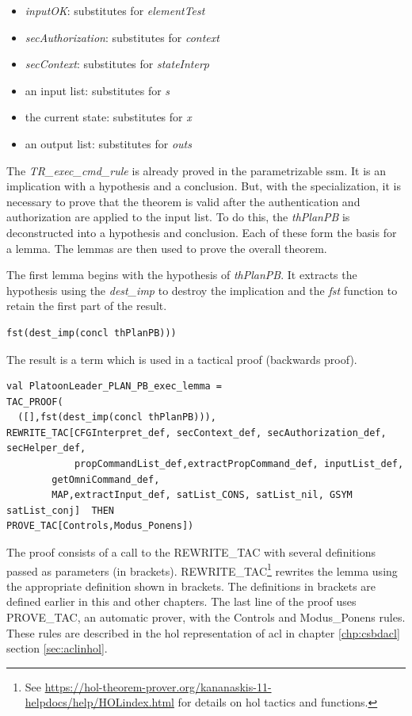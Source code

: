 \documentclass[../../main/main.tex]{subfiles}
\begin{document}
\begin{itemize}
\item \textit{inputOK}: substitutes for \textit{elementTest}
\item \textit{secAuthorization}: substitutes for \textit{context}
\item \textit{secContext}: substitutes for \textit{stateInterp}
\item an input list: substitutes for \textit{s}
\item the current state: substitutes for \textit{x}
\item an output list: substitutes for \textit{outs}
\end{itemize}

The \textit{TR_exec_cmd_rule} is already proved in the parametrizable ssm. It is an implication with a hypothesis and a conclusion.  But, with the specialization, it is necessary to prove that the theorem is valid after the authentication and authorization are applied to the input list. To do this, the \textit{thPlanPB} is deconstructed into a hypothesis and conclusion.  Each of these form the basis for a lemma.  The lemmas are then used to prove the overall theorem.

The first lemma begins with the hypothesis of \textit{thPlanPB}. It extracts the hypothesis using the \textit{dest_imp} to destroy the implication and the \textit{fst} function to retain the first part of the result.  

\begin{lstlisting}
fst(dest_imp(concl thPlanPB)))
\end{lstlisting}

The result is a  term which is used in a tactical proof (backwards proof).
\begin{lstlisting}
val PlatoonLeader_PLAN_PB_exec_lemma =
TAC_PROOF(
  ([],fst(dest_imp(concl thPlanPB))),
REWRITE_TAC[CFGInterpret_def, secContext_def, secAuthorization_def, secHelper_def,
            propCommandList_def,extractPropCommand_def, inputList_def,
	    getOmniCommand_def,
	    MAP,extractInput_def, satList_CONS, satList_nil, GSYM satList_conj]  THEN
PROVE_TAC[Controls,Modus_Ponens])
\end{lstlisting}

The proof consists of a call to the REWRITE_TAC with several definitions passed as parameters (in brackets).  REWRITE_TAC\footnote{See \url{https://hol-theorem-prover.org/kananaskis-11-helpdocs/help/HOLindex.html} for details on \gls{hol} tactics and functions.} rewrites the lemma using the appropriate definition shown in brackets.  The definitions in brackets are defined earlier in this and other chapters. The last line of the proof uses PROVE_TAC, an automatic prover, with the Controls and Modus_Ponens rules.  These rules are described in the \gls{hol} representation of \gls{acl} in chapter \ref{chp:csbdacl} section \ref{sec:aclinhol}.
\end{document}
